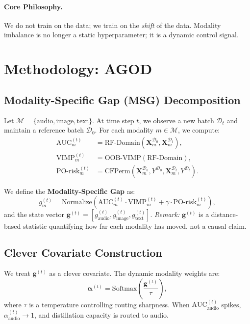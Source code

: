 \documentclass[11pt]{article}
\begin{document}
\paragraph{Core Philosophy.}
We do not train on the data; we train on the \emph{shift} of the data. Modality imbalance is no longer a static hyperparameter; it is a dynamic control signal.

\section{Methodology: AGOD}
\label{sec:method}

\subsection{Modality-Specific Gap (MSG) Decomposition}

Let \(\mathcal{M} = \{\text{audio}, \text{image}, \text{text}\}\). At time step \(t\), we observe a new batch \(\mathcal{D}_t\) and maintain a reference batch \(\mathcal{D}_0\). For each modality \(m \in \mathcal{M}\), we compute:
\begin{align}
    \text{AUC}_m^{(t)} &= \text{RF-Domain}(\mathbf{X}_m^{\mathcal{D}_0}, \mathbf{X}_m^{\mathcal{D}_t}), \\
    \text{VIMP}_m^{(t)} &= \text{OOB-VIMP}(\text{RF-Domain}), \\
    \text{PO-risk}_m^{(t)} &= \text{CFPerm}(\mathbf{X}_m^{\mathcal{D}_0}, Y^{\mathcal{D}_0}, \mathbf{X}_m^{\mathcal{D}_t}, Y^{\mathcal{D}_t}).
\end{align}

We define the \textbf{Modality-Specific Gap} as:
\begin{equation}
    g_m^{(t)} = \text{Normalize}\left( \text{AUC}_m^{(t)} \cdot \text{VIMP}_m^{(t)} + \gamma \cdot \text{PO-risk}_m^{(t)} \right),
\end{equation}
and the state vector \(\mathbf{g}^{(t)} = [g_{\text{audio}}^{(t)}, g_{\text{image}}^{(t)}, g_{\text{text}}^{(t)}]\).
\textit{Remark:} \(\mathbf{g}^{(t)}\) is a distance-based statistic quantifying how far each modality has moved, not a causal claim.

\subsection{Clever Covariate Construction}

We treat \(\mathbf{g}^{(t)}\) as a clever covariate. The dynamic modality weights are:
\begin{equation}
    \boldsymbol{\alpha}^{(t)} = \text{Softmax}\left( \frac{\mathbf{g}^{(t)}}{\tau} \right),
\end{equation}
where \(\tau\) is a temperature controlling routing sharpness. When \(\text{AUC}_{\text{audio}}^{(t)}\) spikes, \(\alpha_{\text{audio}}^{(t)} \to 1\), and distillation capacity is routed to audio.
\end{document}
